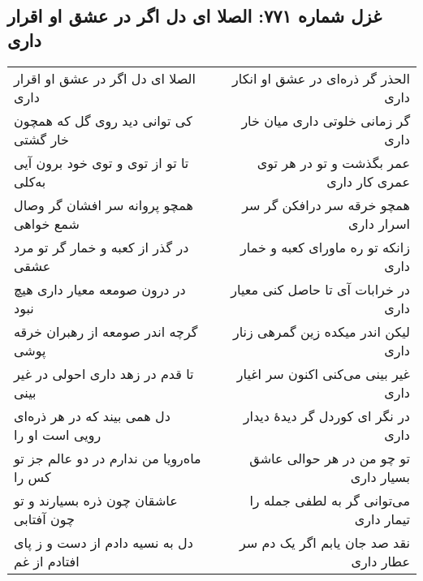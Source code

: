 \begin{center}
\section*{غزل شماره ۷۷۱: الصلا ای دل اگر در عشق او اقرار داری}
\label{sec:771}
\begin{longtable}{l p{0.5cm} r}
الصلا ای دل اگر در عشق او اقرار داری
&&
الحذر گر ذره‌ای در عشق او انکار داری
\\
کی توانی دید روی گل که همچون خار گشتی
&&
گر زمانی خلوتی داری میان خار داری
\\
تا تو از توی و توی خود برون آیی به‌کلی
&&
عمر بگذشت و تو در هر توی عمری کار داری
\\
همچو پروانه سر افشان گر وصال شمع خواهی
&&
همچو خرقه سر درافکن گر سر اسرار داری
\\
در گذر از کعبه و خمار گر تو مرد عشقی
&&
زانکه تو ره ماورای کعبه و خمار داری
\\
در درون صومعه معیار داری هیچ نبود
&&
در خرابات آی تا حاصل کنی معیار داری
\\
گرچه اندر صومعه از رهبران خرقه پوشی
&&
لیکن اندر میکده زین گمرهی زنار داری
\\
تا قدم در زهد داری احولی در غیر بینی
&&
غیر بینی می‌کنی اکنون سر اغیار داری
\\
دل همی بیند که در هر ذره‌ای رویی است او را
&&
در نگر ای کوردل گر دیدهٔ دیدار داری
\\
ماه‌رویا من ندارم در دو عالم جز تو کس را
&&
تو چو من در هر حوالی عاشق بسیار داری
\\
عاشقان چون ذره بسیارند و تو چون آفتابی
&&
می‌توانی گر به لطفی جمله را تیمار داری
\\
دل به نسیه دادم از دست و ز پای افتادم از غم
&&
نقد صد جان یابم اگر یک دم سر عطار داری
\\
\end{longtable}
\end{center}
